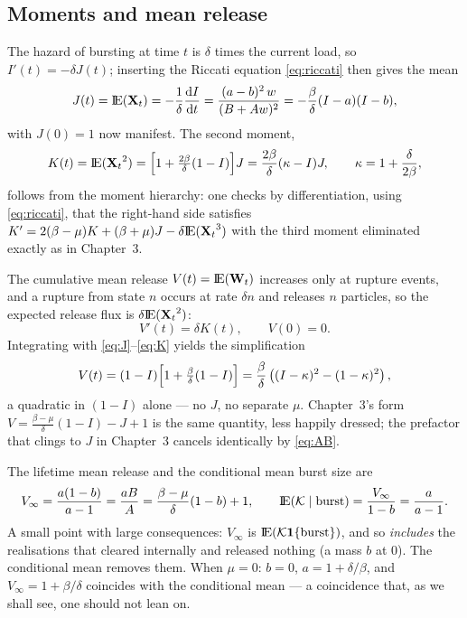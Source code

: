\subsection{Moments and mean release}
\label{sec:moments-recap}

The hazard of bursting at time $t$ is $\delta$ times the current load, so
$I'(t)=-\delta J(t)$; inserting the Riccati equation \eqref{eq:riccati}
then gives the mean
\begin{equation}
J(t)={\rm I}\!{\rm E}({{\bf X}_t})=-\frac{1}{\delta}\displaystyle\frac{{\rm d} I}{{\rm d} t}
=\frac{(a-b)^2\,w}{(B+Aw)^2}
=-\frac{\beta}{\delta}(I-a)(I-b),
\label{eq:J}
\end{equation}
with $J(0)=1$ now manifest. The second moment,
\begin{equation}
K(t)={\rm I}\!{\rm E}({{\bf X}_t}^2)=\Bigl[1+\tfrac{2\beta}{\delta}(1-I)\Bigr]J
=\frac{2\beta}{\delta}(\kappa-I)J,\qquad \kappa=1+\frac{\delta}{2\beta},
\label{eq:K}
\end{equation}
follows from the moment hierarchy: one checks by differentiation, using
\eqref{eq:riccati}, that the right-hand side satisfies
$K'=2(\beta-\mu)K+(\beta+\mu)J-\delta{\rm I}\!{\rm E}({{\bf X}_t}^3)$ with the third moment
eliminated exactly as in Chapter~3.

The cumulative mean release $V(t)={\rm I}\!{\rm E}({{\bf W}_t})$ increases only at rupture
events, and a rupture from state $n$ occurs at rate $\delta n$ and releases
$n$ particles, so the expected release flux is $\delta{\rm I}\!{\rm E}({{\bf X}_t}^2)$:
\begin{equation}
V'(t)=\delta K(t),\qquad V(0)=0.
\end{equation}
Integrating with \eqref{eq:J}--\eqref{eq:K} yields the simplification
\begin{equation}
V(t)=(1-I)\Bigl[1+\tfrac{\beta}{\delta}(1-I)\Bigr]
=\frac{\beta}{\delta}\left((I-\kappa)^2-(1-\kappa)^2\right),
\label{eq:V}
\end{equation}
a quadratic in $(1-I)$ alone --- no $J$, no separate $\mu$. Chapter~3's form
$V=\frac{\beta-\mu}{\delta}(1-I)-J+1$ is the same quantity, less happily
dressed; the prefactor that clings to $J$ in Chapter~3 cancels identically by
\eqref{eq:AB}.

The lifetime mean release and the conditional mean burst size are
\begin{equation}
V_\infty=\frac{a(1-b)}{a-1}=\frac{aB}{A}
=\frac{\beta-\mu}{\delta}(1-b)+1,
\qquad
{\rm I}\!{\rm E}(\mathcal{K}\mid\text{burst})=\frac{V_\infty}{1-b}=\frac{a}{a-1}.
\label{eq:Vinf}
\end{equation}
A small point with large consequences: $V_\infty$ is
${\rm I}\!{\rm E}(\mathcal{K}\mathbf 1\{\text{burst}\})$, and so \emph{includes} the
realisations that cleared internally and released nothing (a mass $b$ at
$0$). The conditional mean removes them. When $\mu=0$: $b=0$,
$a=1+\delta/\beta$, and $V_\infty=1+\beta/\delta$ coincides with the
conditional mean --- a coincidence that, as we shall see, one should not
lean on.

